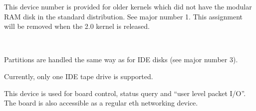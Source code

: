 \noindent
This device number is provided for older kernels which did not have
the modular RAM disk in the standard distribution.  See major number
1.  This assignment will be removed when the 2.0 kernel is released.

\begin{devicelist}
\\
	\minordots
\end{devicelist}

\noindent
Partitions are handled the same way as for IDE disks (see major number
3).

\begin{devicelist}
\end{devicelist}

\noindent
Currently, only one IDE tape drive is supported.

\begin{devicelist}
\end{devicelist}

\begin{devicelist}
	\minordots
\end{devicelist}

\noindent
This device is used for board control, status query and ``user level
packet I/O''.  The board is also accessible as a regular {\file eth}
networking device.

\begin{devicelist}
\end{devicelist}

